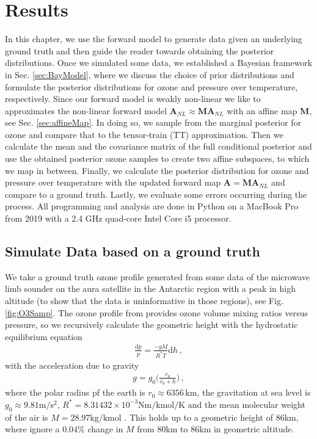 \chapter{Results}
\label{ch:res}
In this chapter, we use the forward model to generate data given an underlying ground truth and then guide the reader towards obtaining the posterior distributions.
Once we simulated some data, we established a Bayesian framework in Sec. \ref{sec:BayModel}, where we discuss the choice of prior distributions and formulate the posterior distributions for ozone and pressure over temperature, respectively.
Since our forward model is weakly non-linear we like to approximates the non-linear forward model $\bm{A}_{NL} \approx \bm{M} \bm{A}_{NL}$ with an affine map $\bm{M}$, see Sec. \ref{sec:affineMap}.
In doing so, we sample from the marginal posterior for ozone and compare that to the tensor-train (TT) approximation.
Then we calculate the mean and the covariance matrix of the full conditional posterior and use the obtained posterior ozone samples to create two affine subspaces, to which we map in between.
Finally, we calculate the posterior distribution for ozone and pressure over temperature with the updated forward map $\bm{A} = \bm{M} \bm{A}_{NL}$ and compare to a ground truth.
Lastly, we evaluate some errors occurring during the process.
All programming and analysis are done in Python on a MacBook Pro from 2019 with a 2.4 GHz quad-core Intel Core i5 processor.

\section{Simulate Data based on a ground truth}
We take a ground truth ozone profile generated from some data \cite{MLSdata} of the microwave limb sounder on the aura satellite in the Antarctic region with a peak in high altitude (to show that the data is uninformative in those regions), see Fig. \ref{fig:O3Samp}.
The ozone profile from \cite{MLSdata} provides ozone volume mixing ratios versus pressure, so we recursively calculate the geometric height with the hydrostatic equilibrium equation
\begin{align}
	\frac{\text{d}p}{p} = \frac{- g M}{R^* T} \text{d} h \, ,
\end{align}
with the acceleration due to gravity
\begin{align}
	g = g_0 \Bigg( \frac{r_0}{r_0 + h} \Bigg) \, ,
\end{align}
where the polar radius pf the earth is $r_0 \approx 6356 \, \text{km}$, the gravitation at sea level is $g_0 \approx 9.81 \text{m}/\text{s}^2$, $R^* = 8.31432 \times 10^{-3} \text{Nm} / \text{kmol} / \text{K}$ and the mean molecular weight of the air is $M = 28.97 \text{kg/kmol}$ \cite{atmosphere1976us}.
This holds up to a geometric height of $86$km, where ignore a $0.04\%$ change in $M$ from $80$km to $86$km in geometric altitude.

